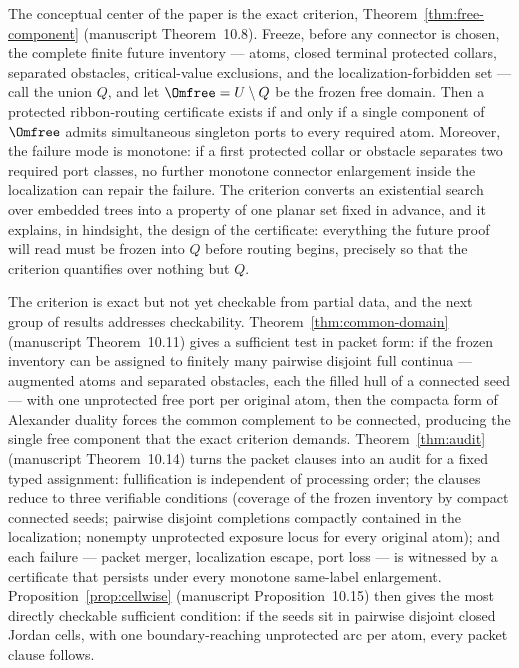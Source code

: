 The conceptual center of the paper is the exact criterion,
Theorem~\ref{thm:free-component} (manuscript Theorem~10.8).  Freeze, before
any connector is chosen, the complete finite future inventory --- atoms,
closed terminal protected collars, separated obstacles, critical-value
exclusions, and the localization-forbidden set --- call the union $Q$, and
let $\Omfree=U\setminus Q$ be the frozen free domain.  Then a protected
ribbon-routing certificate exists if and only if a single component of
$\Omfree$ admits simultaneous singleton ports to every required atom.
Moreover, the failure mode is monotone: if a first protected collar or
obstacle separates two required port classes, no further monotone connector
enlargement inside the localization can repair the failure.  The criterion
converts an existential search over embedded trees into a property of one
planar set fixed in advance, and it explains, in hindsight, the design of
the certificate: everything the future proof will read must be frozen into
$Q$ before routing begins, precisely so that the criterion quantifies over
nothing but $Q$.

The criterion is exact but not yet checkable from partial data, and the next
group of results addresses checkability.  Theorem~\ref{thm:common-domain}
(manuscript Theorem~10.11) gives a sufficient test in packet form: if the
frozen inventory can be assigned to finitely many pairwise disjoint full
continua --- augmented atoms and separated obstacles, each the filled hull of
a connected seed --- with one unprotected free port per original atom, then
the compacta form of Alexander duality forces the common complement to be
connected, producing the single free component that the exact criterion
demands.  Theorem~\ref{thm:audit} (manuscript Theorem~10.14) turns the
packet clauses into an audit for a fixed typed assignment: fullification is
independent of processing order; the clauses reduce to three verifiable
conditions (coverage of the frozen inventory by compact connected seeds;
pairwise disjoint completions compactly contained in the localization;
nonempty unprotected exposure locus for every original atom); and each
failure --- packet merger, localization escape, port loss --- is witnessed
by a certificate that persists under every monotone same-label enlargement.
Proposition~\ref{prop:cellwise} (manuscript Proposition~10.15) then gives
the most directly checkable sufficient condition: if the seeds sit in
pairwise disjoint closed Jordan cells, with one boundary-reaching
unprotected arc per atom, every packet clause follows.

